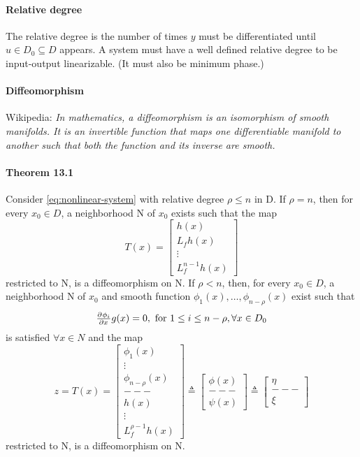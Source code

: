 \paragraph{Relative degree}
The relative degree is the number of times $y$ must be differentiated until $u \in D_0 \subseteq D$ appears. A system must have a well defined relative degree to be input-output linearizable. (It must also be minimum phase.)

\paragraph{Diffeomorphism}
Wikipedia: \emph{In mathematics, a diffeomorphism is an isomorphism of smooth manifolds. It is an invertible function that maps one differentiable manifold to another such that both the function and its inverse are smooth.}

\paragraph{Theorem 13.1}
Consider \eqref{eq:nonlinear-system} with relative degree $\rho \leq n$ in D. If $\rho = n$, then for every $x_0 \in D$, a neighborhood N of $x_0$ exists such that the map
\begin{equation}
	T(x) =
	\left[
	\begin{array}{ccc}
		h(x)     \\
		L_f h(x) \\
		\vdots   \\
		L_f^{n-1} h(x)
	\end{array}
	\right]
\end{equation}
restricted to N, is a diffeomorphism on N. If $\rho < n$, then, for every $x_0 \in D$, a neighborhood N of $x_0$ and smooth function $\phi_1 (x), \dots , \phi_{n-\rho} (x)$ exist such that 
\begin{equation}
	\pd{\phi_i}{x} g(x) = 0, \mbox{ for } 1 \leq i \leq n-\rho, \forall x \in D_0
\end{equation}
is satisfied $\forall x \in N$ and the map
\begin{equation}
	z = T(x) =
	\left[
	\begin{array}{ccc}
		\phi_1(x)         \\
		\vdots            \\
		\phi_{n-\rho}(x)  \\
		---               \\
		h(x)              \\
		\vdots            \\
		L_f^{\rho-1} h(x)
	\end{array}
	\right]
	\triangleq
	\left[
	\begin{array}{ccc}
		\phi(x) \\
		---     \\
		\psi(x)
	\end{array}
	\right]
	\triangleq
	\left[
	\begin{array}{ccc}
		\eta \\
		---  \\
		\xi
	\end{array}
	\right]
\end{equation}
restricted to N, is a diffeomorphism on N.

